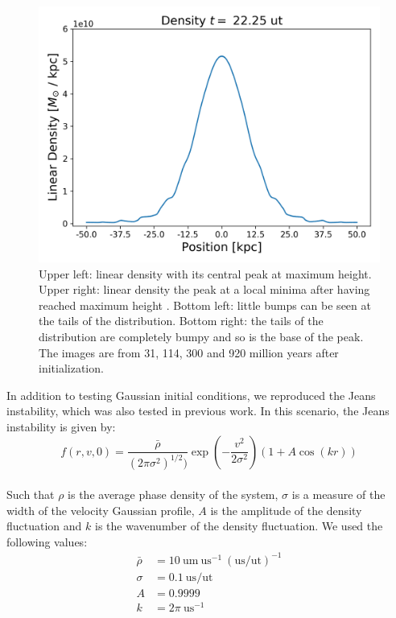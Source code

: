 \begin{figure}[h!]
    \includegraphics[scale=0.45]{imag/gaussD89.png}
    \caption{Upper left: linear density with its central peak at maximum height. Upper right: linear density the peak at a local minima after having reached maximum height . Bottom left: little bumps can be seen at the tails of the distribution. Bottom right: the tails of the distribution are completely bumpy and so is the base of the peak. The images are from 31, 114, 300 and 920 million years after initialization.  }
    \label{1dDens}
\end{figure}

In addition to testing Gaussian initial conditions, we reproduced the Jeans instability, which was also tested in previous work. In this scenario, the Jeans instability is given by:
\begin{equation}
f(r,v,0) = \frac{\bar{\rho}}{(2 \pi \sigma^2)^{1/2})} \exp(-\frac{v^2}{2 \sigma^2}) (1 + A \cos(kr))
\end{equation}\\
Such that $\rho$ is the average phase density of the system, $\sigma$ is a measure of the width of the velocity Gaussian profile, $A$ is the amplitude of the density fluctuation and $k$ is the wavenumber of the density fluctuation. We used the following values:
\begin{align}
\bar{\rho} &= 10 \  \text{um} \ \text{us}^{-1} \ (\text{us/ut})^{-1} \\
\sigma &= 0.1 \ \text{us/ut} \\
A &= 0.9999 \\
k &= 2 \pi \ \text{us}^{-1}
\end{align}

